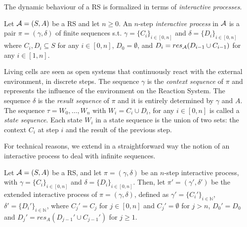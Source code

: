 The dynamic behaviour of a RS is formalized in terms of 
{\em interactive processes}.


\begin{definition}
Let ${\cal A} = (S, A)$ be a RS and let $n \geq 0$. 
An $n$-step
\emph{interactive process} in ${\cal A}$ is a pair $\pi = (\gamma, \delta)$ of 
finite sequences s.t.
%
$ \gamma=\{C_i\}_{i\in[0,n]}$  and $\delta=\{D_i\}_{i\in[0,n]} $
where 
$ C_{i}, D_{i}  \subseteq S$ for any $i\in[0,n]$, $D_0 = \emptyset$, and 
$D_i =  res_{\cal A}(D_{i-1} \cup C_{i-1})$ for any $i \in [1,n]$.
\end{definition}

Living cells are seen as open systems that continuously react with 
the external environment, in discrete steps. 
The sequence $\gamma$ is the {\em context sequence} of $\pi$ and 
represents the influence of the environment on the Reaction System.
The sequence $\delta$ is
the {\em result sequence} of $\pi$ and it is entirely determined by $\gamma$ and $A$.
%
The sequence $\tau = W_{0}, \ldots, W_{n}$ with $W_{i} = C_{i} \cup D_{i}$, 
for any $i \in [0, n]$
is called a \emph{state sequence}.
%
Each state $W_{i}$ in a state sequence
is the union of two sets: the context $C_{i}$
at step $i$ and the result of the previous step.

%
%


For technical reasons, we extend in a straightforward way the notion of an interactive process to deal with 
infinite sequences.

\begin{definition}
Let ${\cal A}=(S,A)$ be a RS, and let $\pi =(\gamma,\delta)$  be an  $n$-step interactive process,
with $ \gamma=\{C_i\}_{i\in[0,n]}$ and  $\delta=\{D_i\}_{i\in[0,n]}$.
Then, let $\pi'= (\gamma',\delta')$ be the extended interactive process of  $\pi =(\gamma,\delta)$,
defined as $  \gamma'=\{C_i'\}_{i\in\mathbb{N}}$, $\delta'=\{D_i'\}_{i\in\mathbb{N}}$, where
 $C_j' = C_j$ for $j\in[0,n]$ and $C_j' =\emptyset$ for $j>n$,   $D_0' = D_0$ and  $D_j' = res_A(D_{j-1}' \cup C_{j-1}')$ for $j\geq 1$.
\end{definition}

